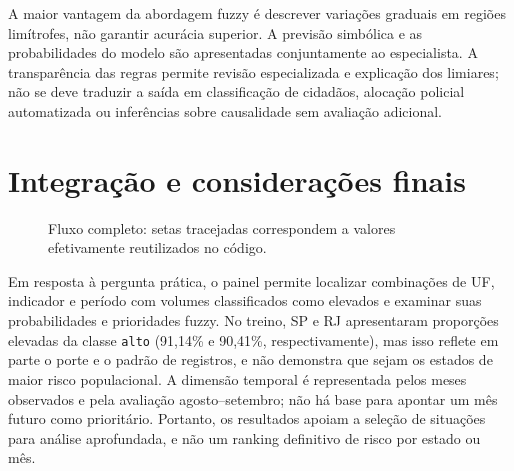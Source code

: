 \documentclass[12pt,a4paper]{article}
\begin{document}
A maior vantagem da abordagem fuzzy é descrever variações graduais em regiões limítrofes, não garantir acurácia superior. A previsão simbólica e as probabilidades do modelo são apresentadas conjuntamente ao especialista. A transparência das regras permite revisão especializada e explicação dos limiares; não se deve traduzir a saída em classificação de cidadãos, alocação policial automatizada ou inferências sobre causalidade sem avaliação adicional.

\section{Integração e considerações finais}
\begin{figure}[H]\centering
{}
\caption{Fluxo completo: setas tracejadas correspondem a valores efetivamente reutilizados no código.}\label{fig:pipeline}\end{figure}

Em resposta à pergunta prática, o painel permite localizar combinações de UF, indicador e período com volumes classificados como elevados e examinar suas probabilidades e prioridades fuzzy. No treino, SP e RJ apresentaram proporções elevadas da classe \texttt{alto} (91,14\% e 90,41\%, respectivamente), mas isso reflete em parte o porte e o padrão de registros, e não demonstra que sejam os estados de maior risco populacional. A dimensão temporal é representada pelos meses observados e pela avaliação agosto--setembro; não há base para apontar um mês futuro como prioritário. Portanto, os resultados apoiam a seleção de situações para análise aprofundada, e não um ranking definitivo de risco por estado ou mês.
\end{document}
